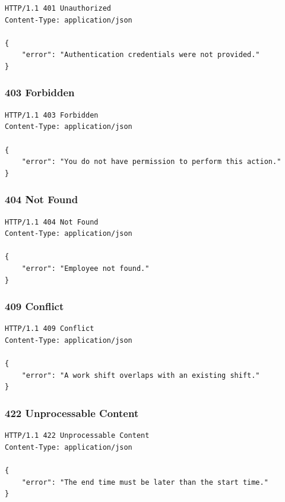 \documentclass[a4paper]{article}
\begin{document}
            \begin{verbatim}
HTTP/1.1 401 Unauthorized
Content-Type: application/json

{
    "error": "Authentication credentials were not provided."
}
                \end{verbatim}
            
            \subsubsection{403 Forbidden}
            
            \begin{verbatim}
HTTP/1.1 403 Forbidden
Content-Type: application/json

{
    "error": "You do not have permission to perform this action."
}
                \end{verbatim}
            
            \subsubsection{404 Not Found}
            
            \begin{verbatim}
HTTP/1.1 404 Not Found
Content-Type: application/json

{
    "error": "Employee not found."
}
                \end{verbatim}
            
            \subsubsection{409 Conflict}
            
            \begin{verbatim}
HTTP/1.1 409 Conflict
Content-Type: application/json

{
    "error": "A work shift overlaps with an existing shift."
}
                \end{verbatim}
            
            \subsubsection{422 Unprocessable Content}
            
            \begin{verbatim}
HTTP/1.1 422 Unprocessable Content
Content-Type: application/json

{
    "error": "The end time must be later than the start time."
}
                \end{verbatim}
    
\end{document}
